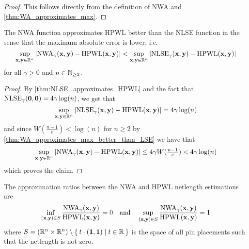 \begin{proof}
 This follows directly from the definition of NWA and \cref{thm:WA_approximates_max}.
\end{proof}


\begin{corollary} \label{thm:NWA_approximates_HPWL_better_than_NLSE}
 The NWA function approximates HPWL better than the NLSE function in the sense that the maximum absolute error is lower, i.e.
 \[ \sup_{\mathbf{x}, \mathbf{y} \in \mathbb{R}^n} \left\lvert \operatorname{NWA}_\gamma(\mathbf{x}, \mathbf{y}) - \operatorname{HPWL}(\mathbf{x}, \mathbf{y}) \right\rvert < \sup_{\mathbf{x}, \mathbf{y} \in \mathbb{R}^n} \left\lvert \operatorname{NLSE}_\gamma(\mathbf{x}, \mathbf{y}) - \operatorname{HPWL}(\mathbf{x}, \mathbf{y}) \right\rvert \]
 for all \(\gamma > 0\) and \(n \in \mathbb{N}_{\geq 2}\).
\end{corollary}

\begin{proof}
 By \cref{thm:NLSE_approximates_HPWL} and the fact that \(\operatorname{NLSE}_\gamma(\mathbf{0}, \mathbf{0}) = 4 \gamma \log(n)\), we get that
 \[ \sup_{\mathbf{x}, \mathbf{y} \in \mathbb{R}^n} \left\lvert \operatorname{NLSE}_\gamma(\mathbf{x}, \mathbf{y}) - \operatorname{HPWL}(\mathbf{x}, \mathbf{y}) \right\rvert = 4 \gamma \log(n) \]
 and since \(W(\tfrac{n-1}{e}) < \log(n)\) for \(n \geq 2\) by \cref{thm:WA_approximates_max_better_than_LSE} we have that
 \[ \sup_{\mathbf{x}, \mathbf{y} \in \mathbb{R}^n} \left\lvert \operatorname{NWA}_\gamma(\mathbf{x}, \mathbf{y}) - \operatorname{HPWL}(\mathbf{x}, \mathbf{y}) \right\rvert \leq 4 \gamma W (\tfrac{n-1}{e}) < 4 \gamma \log(n) \]
 which proves the claim.
\end{proof}


\begin{theorem} \label{thm:NWA_HPWL_approximation_ratios}
 The approximation ratios between the NWA and HPWL netlength estimations are
 \[ 
  \inf_{(\mathbf{x}, \mathbf{y}) \in S} \frac{\operatorname{NWA}_\gamma(\mathbf{x}, \mathbf{y})}{\operatorname{HPWL}(\mathbf{x}, \mathbf{y})} = 0
  \quad \text{and} \quad 
  \sup_{(\mathbf{x}, \mathbf{y}) \in S} \frac{\operatorname{NWA}_\gamma(\mathbf{x}, \mathbf{y})}{\operatorname{HPWL}(\mathbf{x}, \mathbf{y})} = 1
 \]
 where \(S = (\mathbb{R}^n \times \mathbb{R}^n) \setminus \Set{ t \cdot (\mathbf{1}, \mathbf{1}) | t \in \mathbb{R}} \)
 is the space of all pin placements such that the netlength is not zero.
\end{theorem}


